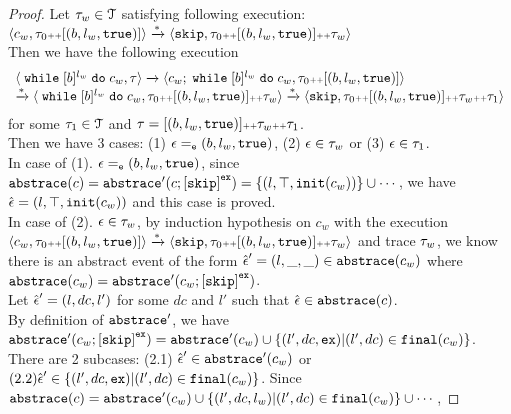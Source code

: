 \begin{proof}
    Let $\trace_w \in \mathcal{T}$ satisfying following execution:
    \\
    $
    \config{{
    c_w,
    \trace_0 \tracecat [(b, l_w, \etrue)]}}
    \xrightarrow{*} 
    \config{{
    \eskip,
    \trace_0 \tracecat [(b, l_w, \etrue)] \tracecat \trace_w}}
  $
  \\
  Then we have the following execution
\[
  \begin{array}{l}
    \config{{\ewhile [b]^{l_w} \edo c_w, \trace}}
  \xrightarrow{} 
  \config{{
  c_w; \ewhile [b]^{l_w} \edo c_w,
  \trace_0 \tracecat [(b, l_w, \etrue)]}} \\
  \xrightarrow{*} 
  \config{{
    \ewhile [b]^{l_w} \edo c_w,
  \trace_0 \tracecat [(b, l_w, \etrue)] \tracecat \trace_w}}
  \xrightarrow{*} 
  \config{{
  \eskip,
  \trace_0 \tracecat [(b, l_w, \etrue)] \tracecat \trace_w \tracecat \trace_1}}
  \end{array}
 \]
  for some $\trace_1 \in \mathcal{T}$ and $\trace = [(b, l_w, \etrue)] \tracecat \trace_w \tracecat \trace_1$.
  \\
  Then we have 3 cases: 
  (1) $\event \eventeq (b, l_w, \etrue)$, 
  (2) $\event \in \trace_w$ or 
  (3) $\event \in \trace_1$.
  \\
  In case of (1). $\event \eventeq (b, l_w, \etrue)$, since $\absflow(c) = \absflow'(c;\clabel{\eskip}^{\lex}) = \{(l, \top, \init(c_w))\} \cup \cdots $, we have $\absevent = (l, \top, \init(c_w))$ and this case is proved.
  \\
  In case of (2). $\event \in \trace_w$,
  by induction hypothesis on 
  $c_w$ with the execution 
    $\config{{
    c_w,
    \trace_0 \tracecat [(b, l_w, \etrue)]}}
    \xrightarrow{*} 
    \config{{
    \eskip,
    \trace_0 \tracecat [(b, l_w, \etrue)] \tracecat \trace_w}}$ and trace $\trace_w$, 
    we know there is an abstract event of the form 
    $\absevent' = (l, \_, \_ ) \in \absflow(c_w)$ where $\absflow(c_w) = \absflow'(c_w;\clabel{\eskip}^{\lex})$.
    \\
    Let $\absevent' = (l, dc, l')$ for some $dc$ and $l'$ such that $\absevent \in \absflow(c)$.
    \\
    By definition of $\absflow'$, we have 
    $ \absflow'(c_w;\clabel{\eskip}^{\lex}) = 
    \absflow'(c_w) \cup  \{ (l', dc, \lex) | (l', dc) \in \absfinal(c_w) \} $.
    \\
    There are 2 subcases: (2.1) $\absevent' \in \absflow'(c_w)$ or 
    $ (2.2) \absevent' \in \{ (l', dc, \lex) | (l', dc) \in \absfinal(c_w) \}$.
    Since $\absflow(c) = \absflow'(c_w) \cup \{(l', dc, l_w)| (l', dc) \in \absfinal(c_w) \} \cup \cdots $, 

\end{proof}
